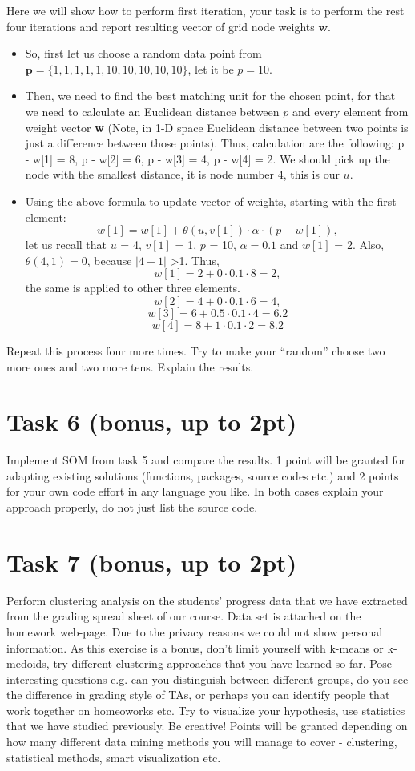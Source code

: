 \documentclass{article}
\begin{document}
Here we will show how to perform first iteration, your task is to perform the rest four iterations and report resulting vector of grid node weights  $\textbf{w}$.
\begin{itemize}
\item So, first let us choose a random data point from $\textbf{p} = \{1,1,1,1,1,10,10,10,10,10\}$, let it be $p = 10$.
\item Then, we need to find the best matching unit for the chosen point, for that we need to calculate an Euclidean distance between $p$ and every element from weight vector \textbf{w} (Note, in 1-D space Euclidean distance between two points is just a difference between those points). Thus, calculation are the following: p - w[1] = 8, p - w[2] = 6, p - w[3] = 4, p - w[4] = 2. We should pick up the node with the smallest distance, it is node number 4, this is our $u$.
\item Using the above formula to update vector of weights, starting with the first element:
$$
w[1] = w[1] + \theta(u, v[1])\cdot\alpha\cdot(p - w[1]),
$$
let us recall that $u$ = 4, $v[1]$ = 1, $p$ = 10, $\alpha = 0.1$ and $w[1]$ = 2. Also, $\theta(4, 1) = 0$, because $|4 - 1|$ \textgreater  1. Thus,
$$
w[1] = 2 + 0\cdot0.1\cdot8 = 2,
$$
the same is applied to other three elements.
$$
w[2] = 4 +  0\cdot0.1\cdot6 = 4,
$$
$$
w[3] = 6 + 0.5\cdot0.1\cdot4 = 6.2
$$
$$
w[4] = 8 + 1\cdot0.1\cdot2 = 8.2
$$
\end{itemize}
Repeat this process four more times. Try to make your ``random'' choose two more ones and two more tens. Explain the results.
\section*{Task 6 (bonus, up to 2pt)}
Implement SOM from task 5 and compare the results. 1 point will be granted for adapting existing solutions (functions, packages, source codes etc.) and 2 points for your own code effort in any language you like. In both cases explain your approach properly, do not just list the source code. 

\section*{Task 7 (bonus, up to 2pt)}
Perform clustering analysis on the students' progress data that we have extracted from the grading spread sheet of our course. Data set is attached on the homework web-page. Due to the privacy reasons we could not show personal information. As this exercise is a bonus, don't limit yourself with k-means or k-medoids, try different clustering approaches that you have learned so far. 
Pose interesting questions e.g. can you distinguish between different groups, do you see the difference in grading style of TAs, or perhaps you can identify people that work together on homeoworks etc. Try to visualize your hypothesis, use statistics that we have studied previously. Be creative!
Points will be granted depending on how many different data mining methods you will manage to cover - clustering, statistical methods, smart visualization etc. 
\end{document}
